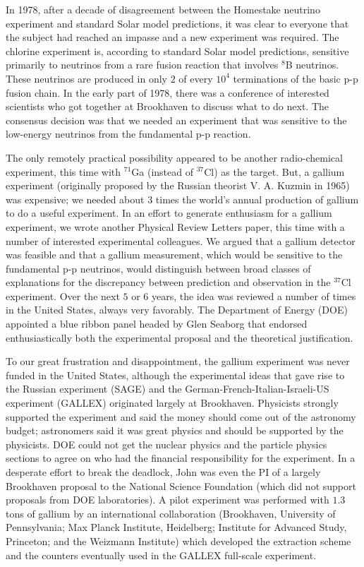 \documentclass[a4paper,10pt]{article}
\begin{document}
{\noindent}In 1978, after a decade of disagreement between the Homestake neutrino experiment and standard Solar model predictions, it was clear to everyone that the subject had reached an impasse and a new experiment was required. The chlorine experiment is, according to standard Solar model predictions, sensitive primarily to neutrinos from a rare fusion reaction that involves $^8$B neutrinos. These neutrinos are produced in only $2$ of every $10^4$ terminations of the basic p-p fusion chain. In the early part of 1978, there was a conference of interested scientists who got together at Brookhaven to discuss what to do next. The consensus decision was that we needed an experiment that was sensitive to the low-energy neutrinos from the fundamental p-p reaction.

{\noindent}The only remotely practical possibility appeared to be another radio-chemical experiment, this time with $^{71}$Ga (instead of $^{37}$Cl) as the target. But, a gallium experiment (originally proposed by the Russian theorist V. A. Kuzmin in 1965) was expensive; we needed about 3 times the world's annual production of gallium to do a useful experiment. In an effort to generate enthusiasm for a gallium experiment, we wrote another Physical Review Letters paper, this time with a number of interested experimental colleagues. We argued that a gallium detector was feasible and that a gallium measurement, which would be sensitive to the fundamental p-p neutrinos, would distinguish between broad classes of explanations for the discrepancy between prediction and observation in the $^{37}$Cl experiment. Over the next $5$ or $6$ years, the idea was reviewed a number of times in the United States, always very favorably. The Department of Energy (DOE) appointed a blue ribbon panel headed by Glen Seaborg that endorsed enthusiastically both the experimental proposal and the theoretical justification.

{\noindent}To our great frustration and disappointment, the gallium experiment was never funded in the United States, although the experimental ideas that gave rise to the Russian experiment (SAGE) and the German-French-Italian-Israeli-US experiment (GALLEX) originated largely at Brookhaven. Physicists strongly supported the experiment and said the money should come out of the astronomy budget; astronomers said it was great physics and should be supported by the physicists. DOE could not get the nuclear physics and the particle physics sections to agree on who had the financial responsibility for the experiment. In a desperate effort to break the deadlock, John was even the PI of a largely Brookhaven proposal to the National Science Foundation (which did not support proposals from DOE laboratories). A pilot experiment was performed with $1.3$ tons of gallium by an international collaboration (Brookhaven, University of Pennsylvania; Max Planck Institute, Heidelberg; Institute for Advanced Study, Princeton; and the Weizmann Institute) which developed the extraction scheme and the counters eventually used in the GALLEX full-scale experiment.
\end{document}

